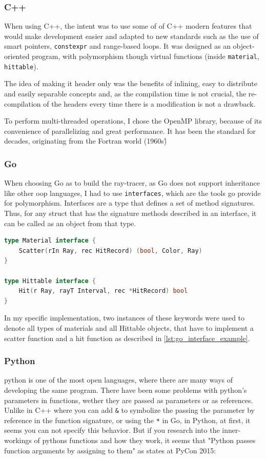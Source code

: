 \subsubsection{C++}
When using C++, the intent was to use some of of C++ modern features that would make development easier and adapted to new standards such as the use of smart pointers, \texttt{constexpr} and range-based loops. It was designed as an object-oriented program, with polymorphism though virtual functions (inside \texttt{material}, \texttt{hittable}).

The idea of making it header only was the benefits of inlining, easy to distribute and easily separable concepts and, as the compilation time is not crucial, the re-compilation of the headers every time there is a modification is not a drawback.

To perform multi-threaded operations, I chose the OpenMP library, because of its convenience of parallelizing and great performance. It has been the standard for decades, originating from the Fortran world (1960s\')

\subsubsection{Go}
When choosing Go as to build the ray-tracer, as Go does not support inheritance like other \gls{oop} languages, I had to use \texttt{interfaces}, which are the tools go provide for polymorphism. Interfaces are a type that defines a set of method signatures. Thus, for any struct that has the signature methods described in an interface, it can be called as an object from that type. 

\begin{lstlisting}[language=Go, caption={Go interface example.}, label={lst:go_interface_example}
]
type Material interface {
	Scatter(rIn Ray, rec HitRecord) (bool, Color, Ray)
}

type Hittable interface {
	Hit(r Ray, rayT Interval, rec *HitRecord) bool
}
\end{lstlisting}

In my specific implementation, two instances of these keywords were used to denote all types of materials and all Hittable objects, that have to implement a scatter function and a hit function as described in \autoref{lst:go_interface_example}.

\subsubsection{Python}
python is one of the most open languages, where there are many ways of developing the same program. There have been some problems with python's parameters in functions, wether they are passed as parameters or as references. Unlike in C++ where you can add \texttt{\&} to symbolize the passing the parameter by reference in the function signature, or using the \texttt{*} in Go, in Python, at first, it seems you can not specify this behavior. But if you research into the inner-workings of pythons functions and how they work, it seems that "Python passes function arguments by assigning to them" as \cite{python-names-pycon15} states at PyCon 2015:

